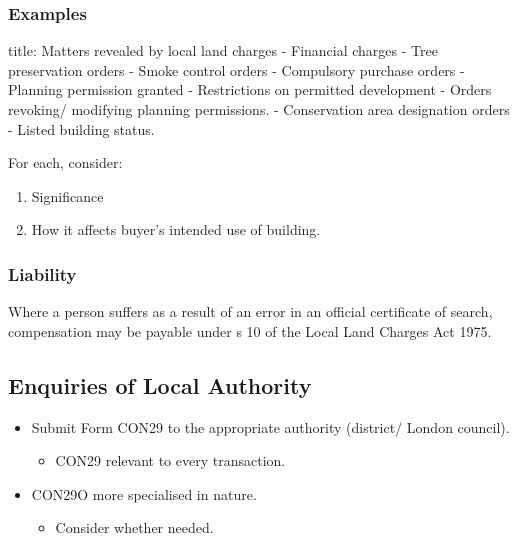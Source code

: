 \documentclass[
]{article}
\newenvironment{Shaded}{}{}
\newcommand{\NormalTok}[1]{#1}
\providecommand{\tightlist}{%
  \setlength{\itemsep}{0pt}\setlength{\parskip}{0pt}}
\begin{document}
\hypertarget{examples}{%
\subsubsection{Examples}\label{examples}}

\begin{Shaded}
\begin{Highlighting}[]
\NormalTok{title: Matters revealed by local land charges}
\NormalTok{{-} Financial charges}
\NormalTok{{-} Tree preservation orders}
\NormalTok{{-} Smoke control orders}
\NormalTok{{-} Compulsory purchase orders}
\NormalTok{{-} Planning permission granted}
\NormalTok{{-} Restrictions on permitted development}
\NormalTok{{-} Orders revoking/ modifying planning permissions. }
\NormalTok{{-} Conservation area designation orders}
\NormalTok{{-} Listed building status. }
\end{Highlighting}
\end{Shaded}

For each, consider:

\begin{enumerate}
\def\labelenumi{\arabic{enumi}.}
\tightlist
\item
  Significance
\item
  How it affects buyer's intended use of building.
\end{enumerate}

\hypertarget{liability}{%
\subsubsection{Liability}\label{liability}}

Where a person suffers as a result of an error in an official
certificate of search, compensation may be payable under s 10 of the
Local Land Charges Act 1975.

\hypertarget{enquiries-of-local-authority}{%
\subsection{Enquiries of Local
Authority}\label{enquiries-of-local-authority}}

\begin{itemize}
\tightlist
\item
  Submit Form CON29 to the appropriate authority (district/ London
  council).

  \begin{itemize}
  \tightlist
  \item
    CON29 relevant to every transaction.
  \end{itemize}
\item
  CON29O more specialised in nature.

  \begin{itemize}
  \tightlist
  \item
    Consider whether needed.
  \end{itemize}
\end{itemize}
\end{document}
